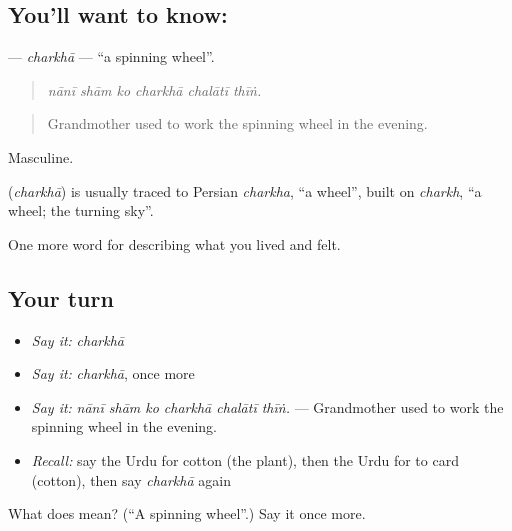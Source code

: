 \subsection*{You'll want to know: }
\textbf{} — \emph{charkhā} — \textquotedblleft{}a spinning wheel\textquotedblright{}.

\begin{quote}
     
\end{quote}

\begin{quote}
\emph{nānī shām ko charkhā chalātī thīṅ.}
\end{quote}

\begin{quote}
Grandmother used to work the spinning wheel in the evening.
\end{quote}

Masculine.

\begin{cousinweb}
\textbf{} (\emph{charkhā}) is usually traced to Persian \emph{charkha}, \textquotedblleft{}a wheel\textquotedblright{}, built on \emph{charkh}, \textquotedblleft{}a wheel; the turning sky\textquotedblright{}.
\end{cousinweb}

\begin{grammarlens}[title={What you've built}]
One more word for describing what you lived and felt.
\end{grammarlens}

\subsection*{Your turn}
\begin{itemize}
\raggedright
  \item \emph{Say it:} \emph{charkhā}
  \item \emph{Say it:} \emph{charkhā}, once more
  \item \emph{Say it:} \emph{nānī shām ko charkhā chalātī thīṅ.} — Grandmother used to work the spinning wheel in the evening.
  \item \emph{Recall:} say the Urdu for cotton (the plant), then the Urdu for to card (cotton), then say \emph{charkhā} again
\end{itemize}

\begin{tcolorbox}[breakable,colback=teal!4,colframe=teal!35!black,title={Before you move on}]
What does  mean? (\textquotedblleft{}A spinning wheel\textquotedblright{}.) Say it once more.
\end{tcolorbox}

